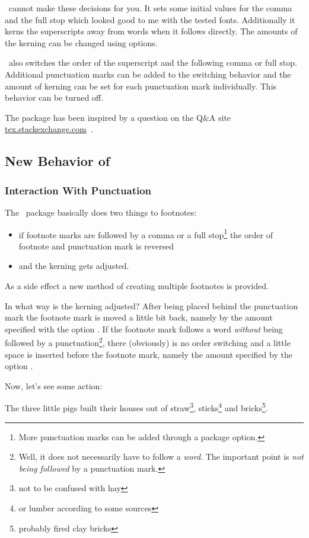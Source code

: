 \documentclass{fnpct-manual}
\begin{document}
\fnpct\ cannot make these decisions for you.  It sets some initial values for
the comma and the full stop which looked good to me with the tested fonts.
Additionally it kerns the superscripts away from words when it follows
directly.  The amounts of the kerning can be changed using options.

\fnpct\ also switches the order of the superscript and the following comma or
full stop.  Additional punctuation marks can be added to the switching
behavior and the amount of kerning can be set for each punctuation mark
individually.  This behavior can be turned off.

The package has been inspired by a question on the Q\&A site
\url{tex.stackexchange.com}~\cite{tex.sx:56094}.

\subsection{New Behavior of }
\subsubsection{Interaction With Punctuation}
The \fnpct\ package basically does two things to footnotes:
\begin{itemize}
  \item if footnote marks are followed by a comma or a full stop\footnote{More
    punctuation marks can be added through a package option.} the order of
  footnote and punctuation mark is reversed
\item and the kerning gets adjusted.
\end{itemize}
As a side effect a new method of creating multiple
footnotes is provided.

In what way is the kerning adjusted?  After being placed behind the
punctuation mark the footnote mark is moved a little bit back, namely by the
amount specified with the option .  If the footnote
mark follows a word \emph{without} being followed by a
punctuation\footnote{Well, it does not necessarily have to follow a
  \emph{word}.  The important point is \emph{not being followed} by a
  punctuation mark.}, there (obviously) is no order switching and a little
space is inserted before the footnote mark, namely the amount specified by the
option .

Now, let's see some action:
\begin{example}
  The three little pigs built their houses out of straw\footnote{not to be
    confused with hay}, sticks\footnote{or lumber according to some sources}
  and bricks\footnote{probably fired clay bricks}.
\end{example}
\end{document}
